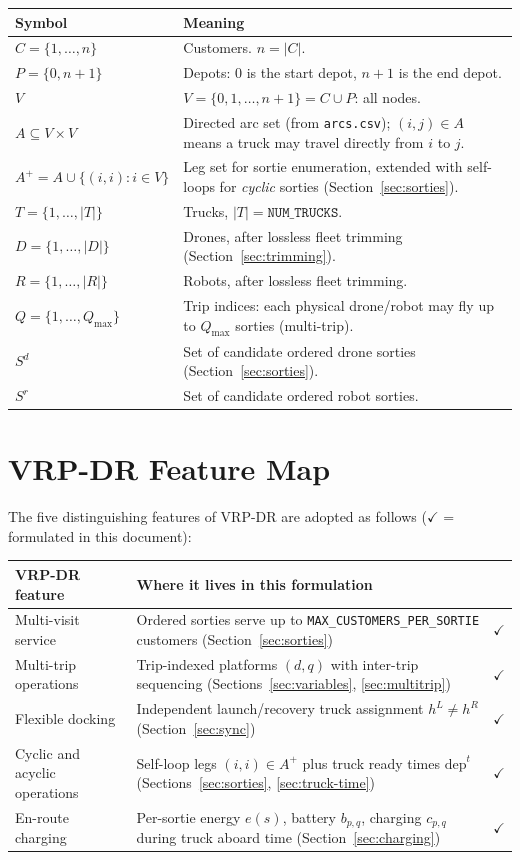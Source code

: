 \documentclass[10pt]{article}
\begin{document}
{\small
\begin{longtable}{@{}p{}p{}@{}}
\toprule
Symbol & Meaning \\
\midrule
$C = \{1,\dots,n\}$ & Customers. $n = |C|$. \\
$P = \{0, n+1\}$ & Depots: $0$ is the start depot, $n+1$ is the end depot. \\
$V$ & $V = \{0,1,\dots,n+1\} = C \cup P$: all nodes. \\
$A \subseteq V \times V$ & Directed arc set (from \texttt{arcs.csv}); $(i,j)\in A$ means a truck may travel directly from $i$ to $j$. \\
$A^+ = A \cup \{(i,i):i\in V\}$ & Leg set for sortie enumeration, extended with self-loops for \emph{cyclic} sorties (Section~\ref{sec:sorties}). \\
$T = \{1,\dots,|T|\}$ & Trucks, $|T| = \texttt{NUM\_TRUCKS}$. \\
$D = \{1,\dots,|D|\}$ & Drones, after lossless fleet trimming (Section~\ref{sec:trimming}). \\
$R = \{1,\dots,|R|\}$ & Robots, after lossless fleet trimming. \\
$Q = \{1,\dots,Q_{\max}\}$ & Trip indices: each physical drone/robot may fly up to $Q_{\max}$ sorties (multi-trip). \\
$S^d$ & Set of candidate ordered drone sorties (Section~\ref{sec:sorties}). \\
$S^r$ & Set of candidate ordered robot sorties. \\
\bottomrule
\end{longtable}
}

\section{VRP-DR Feature Map}
\label{sec:features}

The five distinguishing features of VRP-DR are adopted as follows
($\checkmark$ = formulated in this document):

{\small
\begin{longtable}{@{}p{}p{}c@{}}
\toprule
VRP-DR feature & Where it lives in this formulation & \\
\midrule
Multi-visit service & Ordered sorties serve up to \texttt{MAX\_CUSTOMERS\_PER\_SORTIE} customers (Section~\ref{sec:sorties}) & $\checkmark$ \\
Multi-trip operations & Trip-indexed platforms $(d,q)$ with inter-trip sequencing (Sections~\ref{sec:variables}, \ref{sec:multitrip}) & $\checkmark$ \\
Flexible docking & Independent launch/recovery truck assignment $h^L \ne h^R$ (Section~\ref{sec:sync}) & $\checkmark$ \\
Cyclic and acyclic operations & Self-loop legs $(i,i)\in A^+$ plus truck ready times $\mathrm{dep}^t$ (Sections~\ref{sec:sorties}, \ref{sec:truck-time}) & $\checkmark$ \\
En-route charging & Per-sortie energy $e(s)$, battery $b_{p,q}$, charging $c_{p,q}$ during truck aboard time (Section~\ref{sec:charging}) & $\checkmark$ \\
\bottomrule
\end{longtable}
}
\end{document}
